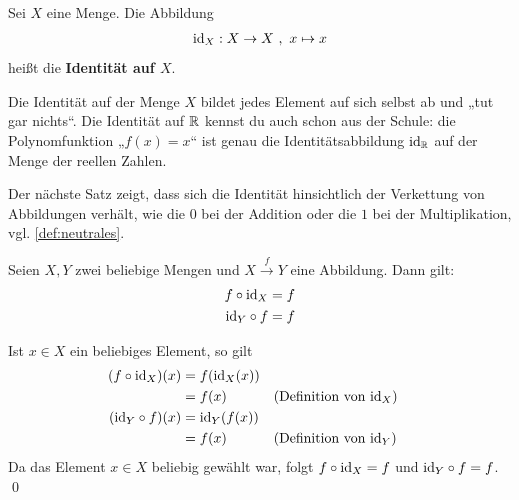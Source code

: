 \begin{de}[Identitätsabbildung] 
    Sei $X$ eine Menge. Die Abbildung
    \begin{align*}
        \mathrm{id}_X: X \to X \ ,\ x \mapsto x
    \end{align*}
    heißt die \textbf{Identität auf $X$}.
\end{de}


\begin{bem}
    Die Identität auf der Menge $X$ bildet jedes Element auf sich selbst ab und „tut gar nichts“. Die Identität auf $\mathbb R$ kennst du auch schon aus der Schule: die Polynomfunktion „$f(x)=x$“ ist genau die Identitätsabbildung $\mathrm{id}_\mathbb R$ auf der Menge der reellen Zahlen.
\end{bem}


\noindent Der nächste Satz zeigt, dass sich die Identität hinsichtlich der Verkettung von Abbildungen verhält, wie die $0$ bei der Addition oder die $1$ bei der Multiplikation, vgl. \cref{def:neutrales}.


\begin{satz} \label{idneutral}
    Seien $X,Y$ zwei beliebige Mengen und $X\xrightarrow{f} Y$ eine Abbildung. Dann gilt:
    \begin{align*}
        f\circ \mathrm{id}_X & = f \\
        \mathrm{id}_Y \circ f & = f
    \end{align*}
\end{satz}


\begin{bew}
    Ist $x \in X$ ein beliebiges Element, so gilt
    \begin{align*}
        (f\circ \mathrm{id}_X)(x) & = f(\mathrm{id}_X(x)) \\
        & =f(x) && (\text{Definition von $\mathrm{id}_X$}) \\
        (\mathrm{id}_Y \circ f)(x) & =\mathrm{id}_Y(f(x)) \\
        & = f(x)&& (\text{Definition von $\mathrm{id}_Y$})
    \end{align*}
    Da das Element $x\in X$ beliebig gewählt war, folgt $f\circ \mathrm{id}_X=f$ und $\mathrm{id}_Y\circ f=f$. \qed
\end{bew}


